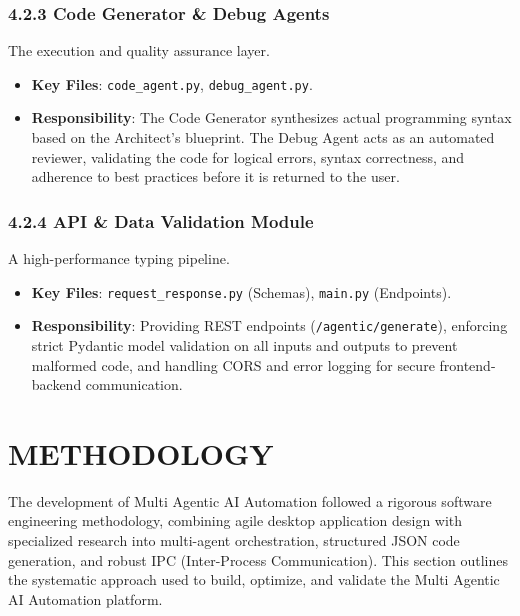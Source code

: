 \documentclass[
  12pt,
]{article}
\providecommand{\tightlist}{%
  \setlength{\itemsep}{0pt}\setlength{\parskip}{0pt}}
\begin{document}
\subsubsection{4.2.3 Code Generator \& Debug
Agents}\label{code-generator-debug-agents}

The execution and quality assurance layer.

\begin{itemize}
\tightlist
\item
  \textbf{Key Files}: \texttt{code\_agent.py}, \texttt{debug\_agent.py}.
\item
  \textbf{Responsibility}: The Code Generator synthesizes actual
  programming syntax based on the Architect's blueprint. The Debug Agent
  acts as an automated reviewer, validating the code for logical errors,
  syntax correctness, and adherence to best practices before it is
  returned to the user.
\end{itemize}

\subsubsection{4.2.4 API \& Data Validation
Module}\label{api-data-validation-module}

A high-performance typing pipeline.

\begin{itemize}
\tightlist
\item
  \textbf{Key Files}: \texttt{request\_response.py} (Schemas),
  \texttt{main.py} (Endpoints).
\item
  \textbf{Responsibility}: Providing REST endpoints
  (\texttt{/agentic/generate}), enforcing strict Pydantic model
  validation on all inputs and outputs to prevent malformed code, and
  handling CORS and error logging for secure frontend-backend
  communication.
\end{itemize}

\newpage

\section{METHODOLOGY}\label{methodology}

The development of Multi Agentic AI Automation followed a rigorous
software engineering methodology, combining agile desktop application
design with specialized research into multi-agent orchestration,
structured JSON code generation, and robust IPC (Inter-Process
Communication). This section outlines the systematic approach used to
build, optimize, and validate the Multi Agentic AI Automation platform.
\end{document}
